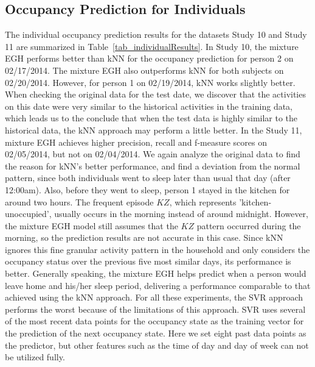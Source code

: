 \subsection{Occupancy Prediction for Individuals}

The individual occupancy prediction results for the datasets Study 10 and Study 11 are summarized in Table~\ref{tab_individualResults}. 
In Study 10,  the mixture EGH performs better than kNN for the occupancy prediction for person 2 on 02/17/2014. 
The mixture EGH also outperforms kNN for both subjects on 02/20/2014. 
However, for person 1 on 02/19/2014, kNN works slightly better. 
When checking the original data for the test date, 
we discover that the activities on this date were very similar to the historical activities in the training data, 
which leads us to the conclude that when the test data is highly similar to the historical data, 
the kNN approach may perform a little better.  
In the Study 11, mixture EGH achieves higher precision, recall and f-measure scores on 02/05/2014, but not on 02/04/2014. 
We again analyze the original data to find the reason for kNN's better performance, and find a deviation from the normal pattern, since both individuals went to sleep later than usual that day (after 12:00am).
Also, before they went to sleep, person 1 stayed in the kitchen for around two hours. 
The frequent episode $KZ$, which represents 'kitchen-unoccupied', 
usually occurs in the morning instead of around midnight. 
However, the mixture EGH model still assumes that the $KZ$ pattern 
occurred during the morning, so the prediction results are not accurate in this case. 
Since kNN ignores this fine granular activity pattern in the household and only considers the occupancy status 
over the previous five most similar days, its performance is better. 
Generally speaking, the mixture EGH helps predict when a person 
would leave home and his/her sleep period, delivering a  
performance comparable to that achieved using the kNN approach. 
For all these experiments, the SVR approach performs the worst because 
of the limitations of this approach. 
SVR uses several of the most recent data points for the occupancy state as the 
training vector for the prediction of the next occupancy state. 
Here we set eight past data points as the predictor, but
other features such as the time of day and day of week can not be utilized fully. 

